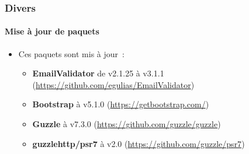 %

\begin{frame}[fragile]
	\frametitle{Divers}
	\framesubtitle{Mise à jour de paquets}


	\begin{itemize}
		\item Ces paquets sont mis à jour :

			\begin{itemize}
				\item \small\textbf{EmailValidator} de v2.1.25 à v3.1.1\newline
					(\url{https://github.com/egulias/EmailValidator})\normalsize
				\item \small\textbf{Bootstrap} à v5.1.0\newline
					(\url{https://getbootstrap.com/})\normalsize
				\item \small\textbf{Guzzle} à v7.3.0\newline
					(\url{https://github.com/guzzle/guzzle})\normalsize
				\item \small\textbf{guzzlehttp/psr7} à v2.0\newline
					(\url{https://github.com/guzzle/psr7})\normalsize
			\end{itemize}
	\end{itemize}

\end{frame}

